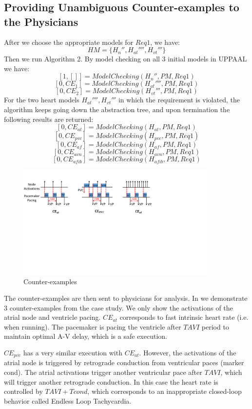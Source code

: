 \subsection{Providing Unambiguous Counter-examples to the Physicians}
After we choose the appropriate models for $Req1$, we have: 
$$HM=\{H_n'',H_{at}'''',H_{vt}'''\}$$
Then we run Algorithm 2. By model checking on all 3 initial models in UPPAAL we have: 
$$[1,[]]=ModelChecking(H_n'',PM,Req1)$$
 $$[0,CE_1]=ModelChecking(H_{at}'''',PM,Req1)$$
$$[0,CE_2]=ModelChecking(H_{vt}''',PM,Req1)$$
For the two heart models $H_{at}'''',H_{vt}'''$ in which the requirement is violated, the algorithm keeps going down the abstraction tree, and upon termination the following results are returned:
$$[0,CE_{at}]=ModelChecking(H_{at},PM,Req1)$$
$$[0,CE_{pvc}]=ModelChecking(H_{pvc},PM,Req1)$$
$$[0,CE_{af}]=ModelChecking(H_{af},PM,Req1)$$
$$[0,CE_{avn}]=ModelChecking(H_{avn},PM,Req1)$$
$$[0,CE_{afib}]=ModelChecking(H_{afib},PM,Req1)$$

\begin{figure}[!t]
		\centering
		\includegraphics[width=0.9\textwidth]{figs/case.pdf}
		\caption{\small Counter-examples}
		\label{fig:CE}
\end{figure}

The counter-examples are then sent to physicians for analysis. In  we demonstrate 3 counter-examples from the case study. We only show the activations of the atrial node and ventricle pacing. 
$CE_{at}$ corresponds to fast intrinsic heart rate (i.e. when running). The pacemaker is pacing the ventricle after $TAVI$ period to maintain optimal A-V delay, which is a safe execution. 

$CE_{pvc}$ has a very similar execution with $CE_{at}$. However, the activations of the atrial node is triggered by retrograde conduction from ventricular paces (marker \textsf{cond}). The atrial activations trigger another ventricular pace after $TAVI$, which will trigger another retrograde conduction. In this case the heart rate is controlled by $TAVI+Tcond$, which corresponds to an inappropriate closed-loop behavior called Endless Loop Tachycardia.

